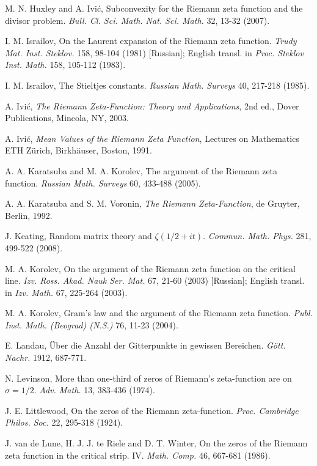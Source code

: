 \documentclass[11pt]{article}
\begin{document}
\begin{thebibliography}{99}
 M. N. Huxley and A. Ivić, Subconvexity for the Riemann zeta function and the divisor problem. \textit{Bull. Cl. Sci. Math. Nat. Sci. Math.} 32, 13-32 (2007).

 I. M. Israilov, On the Laurent expansion of the Riemann zeta function. \textit{Trudy Mat. Inst. Steklov.} 158, 98-104 (1981) [Russian]; English transl. in \textit{Proc. Steklov Inst. Math.} 158, 105-112 (1983).

 I. M. Israilov, The Stieltjes constants. \textit{Russian Math. Surveys} 40, 217-218 (1985).

 A. Ivić, \textit{The Riemann Zeta-Function: Theory and Applications}, 2nd ed., Dover Publications, Mineola, NY, 2003.

 A. Ivić, \textit{Mean Values of the Riemann Zeta Function}, Lectures on Mathematics ETH Zürich, Birkhäuser, Boston, 1991.

 A. A. Karatsuba and M. A. Korolev, The argument of the Riemann zeta function. \textit{Russian Math. Surveys} 60, 433-488 (2005).

 A. A. Karatsuba and S. M. Voronin, \textit{The Riemann Zeta-Function}, de Gruyter, Berlin, 1992.

 J. Keating, Random matrix theory and $\zeta(1/2+it)$. \textit{Commun. Math. Phys.} 281, 499-522 (2008).

 M. A. Korolev, On the argument of the Riemann zeta function on the critical line. \textit{Izv. Ross. Akad. Nauk Ser. Mat.} 67, 21-60 (2003) [Russian]; English transl. in \textit{Izv. Math.} 67, 225-264 (2003).

 M. A. Korolev, Gram's law and the argument of the Riemann zeta function. \textit{Publ. Inst. Math. (Beograd) (N.S.)} 76, 11-23 (2004).

 E. Landau, Über die Anzahl der Gitterpunkte in gewissen Bereichen. \textit{Gött. Nachr.} 1912, 687-771.

 N. Levinson, More than one-third of zeros of Riemann's zeta-function are on $\sigma = 1/2$. \textit{Adv. Math.} 13, 383-436 (1974).

 J. E. Littlewood, On the zeros of the Riemann zeta-function. \textit{Proc. Cambridge Philos. Soc.} 22, 295-318 (1924).

 J. van de Lune, H. J. J. te Riele and D. T. Winter, On the zeros of the Riemann zeta function in the critical strip. IV. \textit{Math. Comp.} 46, 667-681 (1986).


\end{thebibliography}
\end{document}
